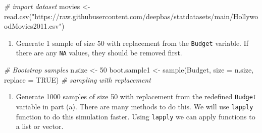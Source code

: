 \documentclass[
]{book}
\newenvironment{Shaded}{\begin{snugshade}}{\end{snugshade}}
\newcommand{\AttributeTok}[1]{\textcolor[rgb]{0.77,0.63,0.00}{#1}}
\newcommand{\CommentTok}[1]{\textcolor[rgb]{0.56,0.35,0.01}{\textit{#1}}}
\newcommand{\ConstantTok}[1]{\textcolor[rgb]{0.00,0.00,0.00}{#1}}
\newcommand{\DecValTok}[1]{\textcolor[rgb]{0.00,0.00,0.81}{#1}}
\newcommand{\FunctionTok}[1]{\textcolor[rgb]{0.00,0.00,0.00}{#1}}
\newcommand{\NormalTok}[1]{#1}
\newcommand{\OtherTok}[1]{\textcolor[rgb]{0.56,0.35,0.01}{#1}}
\newcommand{\SpecialCharTok}[1]{\textcolor[rgb]{0.00,0.00,0.00}{#1}}
\newcommand{\StringTok}[1]{\textcolor[rgb]{0.31,0.60,0.02}{#1}}
\providecommand{\tightlist}{%
  \setlength{\itemsep}{0pt}\setlength{\parskip}{0pt}}
\begin{document}
\begin{Shaded}
\begin{Highlighting}[]
\CommentTok{\# import dataset}
\NormalTok{movies }\OtherTok{\textless{}{-}} \FunctionTok{read.csv}\NormalTok{(}\StringTok{"https://raw.githubusercontent.com/deepbas/statdatasets/main/HollywoodMovies2011.csv"}\NormalTok{)}
\end{Highlighting}
\end{Shaded}

\begin{enumerate}
\def\labelenumi{(\alph{enumi})}
\tightlist
\item
  Generate 1 sample of size 50 with replacement from the \texttt{Budget} variable. If there are any \texttt{NA} values, they should be removed first.
\end{enumerate}

\begin{Shaded}
\end{Shaded}

\begin{Shaded}
\begin{Highlighting}[]
\CommentTok{\# Bootstrap samples}
\NormalTok{n.size }\OtherTok{\textless{}{-}} \DecValTok{50}
\NormalTok{boot.sample1 }\OtherTok{\textless{}{-}} \FunctionTok{sample}\NormalTok{(Budget, }\AttributeTok{size =}\NormalTok{ n.size, }\AttributeTok{replace =} \ConstantTok{TRUE}\NormalTok{) }\CommentTok{\# sampling with replacement}
\end{Highlighting}
\end{Shaded}

\begin{enumerate}
\def\labelenumi{(\alph{enumi})}
\setcounter{enumi}{2}
\tightlist
\item
  Generate 1000 samples of size 50 with replacement from the redefined \texttt{Budget} variable in part (a). There are many methods to do this. We will use \texttt{lapply} function to do this simulation faster. Using \texttt{lapply} we can apply functions to a list or vector.
\end{enumerate}
\end{document}
